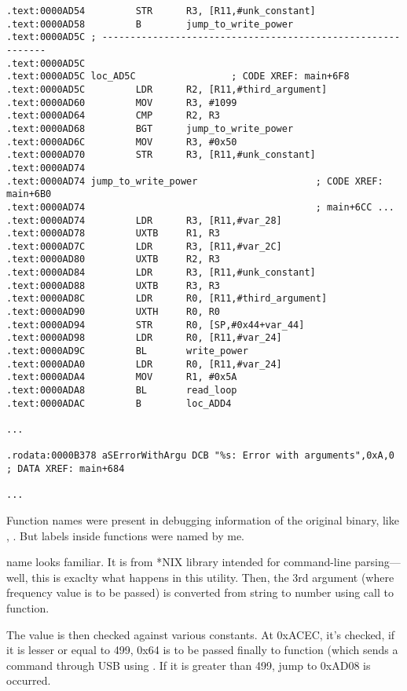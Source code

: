 \begin{lstlisting}
.text:0000AD54         STR      R3, [R11,#unk_constant]
.text:0000AD58         B        jump_to_write_power
.text:0000AD5C ; ------------------------------------------------------------
.text:0000AD5C
.text:0000AD5C loc_AD5C                 ; CODE XREF: main+6F8
.text:0000AD5C         LDR      R2, [R11,#third_argument]
.text:0000AD60         MOV      R3, #1099
.text:0000AD64         CMP      R2, R3
.text:0000AD68         BGT      jump_to_write_power
.text:0000AD6C         MOV      R3, #0x50
.text:0000AD70         STR      R3, [R11,#unk_constant]
.text:0000AD74
.text:0000AD74 jump_to_write_power                     ; CODE XREF: main+6B0
.text:0000AD74                                         ; main+6CC ...
.text:0000AD74         LDR      R3, [R11,#var_28]
.text:0000AD78         UXTB     R1, R3
.text:0000AD7C         LDR      R3, [R11,#var_2C]
.text:0000AD80         UXTB     R2, R3
.text:0000AD84         LDR      R3, [R11,#unk_constant]
.text:0000AD88         UXTB     R3, R3
.text:0000AD8C         LDR      R0, [R11,#third_argument]
.text:0000AD90         UXTH     R0, R0
.text:0000AD94         STR      R0, [SP,#0x44+var_44]
.text:0000AD98         LDR      R0, [R11,#var_24]
.text:0000AD9C         BL       write_power
.text:0000ADA0         LDR      R0, [R11,#var_24]
.text:0000ADA4         MOV      R1, #0x5A
.text:0000ADA8         BL       read_loop
.text:0000ADAC         B        loc_ADD4

...

.rodata:0000B378 aSErrorWithArgu DCB "%s: Error with arguments",0xA,0 ; DATA XREF: main+684

...

\end{lstlisting}

Function names were present in debugging information of the original binary, like , .
But labels inside functions were named by me.

 name looks familiar. It is from  *NIX library intended for command-line parsing---well, this is exaclty what happens in this utility.
Then, the 3rd argument (where frequency value is to be passed) is converted from string to number using call to  function.

The value is then checked against various constants.
At 0xACEC, it's checked, if it is lesser or equal to 499, 0x64 is to be passed finally to  function (which sends a command through USB using .
If it is greater than 499, jump to 0xAD08 is occurred.

